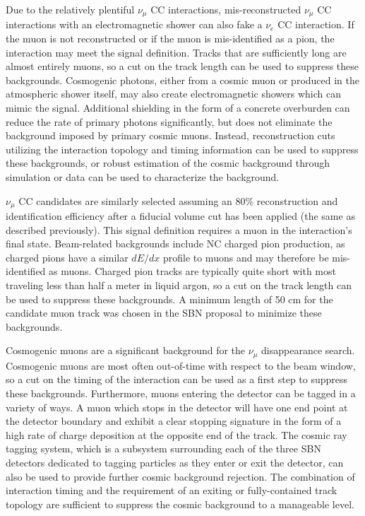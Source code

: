 Due to the relatively plentiful $\nu_\mu$ CC interactions, mis-reconstructed $\nu_\mu$ CC interactions with an electromagnetic shower can also fake a $\nu_e$ CC interaction. If the muon is not reconstructed or if the muon is mis-identified as a pion, the interaction may meet the signal definition. Tracks that are sufficiently long are almost entirely muons, so a cut on the track length can be used to suppress these backgrounds. Cosmogenic photons, either from a cosmic muon or produced in the atmospheric shower itself, may also create electromagnetic showers which can mimic the signal. Additional shielding in the form of a concrete overburden can reduce the rate of primary photons significantly, but does not eliminate the background imposed by primary cosmic muons. Instead, reconstruction cuts utilizing the interaction topology and timing information can be used to suppress these backgrounds, or robust estimation of the cosmic background through simulation or data can be used to characterize the background.

$\nu_\mu$ CC candidates are similarly selected assuming an 80\% reconstruction and identification efficiency after a fiducial volume cut has been applied (the same as described previously). This signal definition requires a muon in the interaction's final state. Beam-related backgrounds include NC charged pion production, as charged pions have a similar $dE/dx$ profile to muons and may therefore be mis-identified as muons. Charged pion tracks are typically quite short with most traveling less than half a meter in liquid argon, so a cut on the track length can be used to suppress these backgrounds. A minimum length of 50 cm for the candidate muon track was chosen in the SBN proposal to minimize these backgrounds.

Cosmogenic muons are a significant background for the $\nu_\mu$ disappearance search. Cosmogenic muons are most often out-of-time with respect to the beam window, so a cut on the timing of the interaction can be used as a first step to suppress these backgrounds. Furthermore, muons entering the detector can be tagged in a variety of ways. A muon which stops in the detector will have one end point at the detector boundary and exhibit a clear stopping signature in the form of a high rate of charge deposition at the opposite end of the track. The cosmic ray tagging system, which is a subsystem surrounding each of the three SBN detectors dedicated to tagging particles as they enter or exit the detector, can also be used to provide further cosmic background rejection. The combination of interaction timing and the requirement of an exiting or fully-contained track topology are sufficient to suppress the cosmic background to a manageable level.

